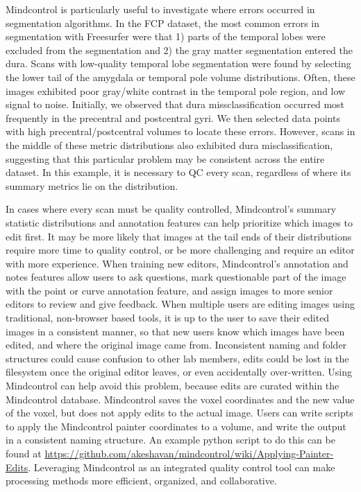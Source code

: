 Mindcontrol is particularly useful to investigate where errors occurred in segmentation algorithms. In the FCP dataset, the most common errors in segmentation with Freesurfer were that 1) parts of the temporal lobes were excluded from the segmentation and 2) the gray matter segmentation entered the dura. Scans with low-quality temporal lobe segmentation were found by selecting the lower tail of the amygdala or temporal pole volume distributions. Often, these images exhibited poor gray/white contrast in the temporal pole region, and low signal to noise. Initially, we observed that dura missclassification occurred most frequently in the precentral and postcentral gyri. We then selected data points with high precentral/postcentral volumes to locate these errors. However, scans in the middle of these metric distributions also exhibited dura misclassification, suggesting that this particular problem may be consistent across the entire dataset. In this example, it is necessary to QC every scan, regardless of where its summary metrics lie on the distribution.  

In cases where every scan must be quality controlled, Mindcontrol's summary statistic distributions and annotation features can help prioritize which images to edit first. It may be more likely that images at the tail ends of their distributions require more time to quality control, or be more challenging and require an editor with more experience. When training new editors, Mindcontrol's annotation and notes features allow users to ask questions, mark questionable part of the image with the point or curve annotation feature, and assign images to more senior editors to review and give feedback. When multiple users are editing images using traditional, non-browser based tools, it is up to the user to save their edited images in a consistent manner, so that new users know which images have been edited, and where the original image came from. Inconsistent naming and folder structures could cause confusion to other lab members, edits could be lost in the filesystem once the original editor leaves, or even accidentally over-written. Using Mindcontrol can help avoid this problem, because edits are curated within the Mindcontrol database. Mindcontrol saves the voxel coordinates and the new value of the voxel, but does not apply edits to the actual image. Users can write scripts to apply the Mindcontrol painter coordinates to a volume, and write the output in a consistent naming structure. An example python script to do this can be found at \href{http://}{https://github.com/akeshavan/mindcontrol/wiki/Applying-Painter-Edits}. Leveraging Mindcontrol as an integrated quality control tool can make processing methods more efficient, organized, and collaborative.


